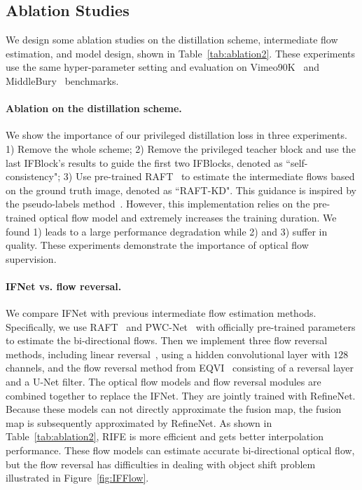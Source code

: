 \documentclass[final]{cvpr}
\begin{document}
\subsection{Ablation Studies}
\label{sec:model_ablation}



We design some ablation studies on the distillation scheme, intermediate flow estimation, and model design, shown in Table~\ref{tab:ablation2}. These experiments use the same hyper-parameter setting and evaluation on Vimeo90K~\cite{xue2019video} and MiddleBury~\cite{baker2011database} benchmarks. 

\paragraph{Ablation on the distillation scheme.} We show the importance of our privileged distillation loss in three experiments. 1) Remove the whole scheme; 2) Remove the privileged teacher block and use the last IFBlock’s results to guide the first two IFBlocks, denoted as ``self-consistency"; 3) Use pre-trained RAFT~\cite{teed2020raft} to estimate the intermediate flows based on the ground truth image, denoted as ``RAFT-KD". This guidance is inspired by the pseudo-labels method~\cite{lee2013pseudo}. However, this implementation relies on the pre-trained optical flow model and extremely increases the training duration. We found 1) leads to a large performance degradation while 2) and 3) suffer in quality. These experiments demonstrate the importance of optical flow supervision.
\paragraph{IFNet vs. flow reversal.}

We compare IFNet with previous intermediate flow estimation methods. Specifically, we use RAFT~\cite{teed2020raft} and PWC-Net~\cite{sun2018pwc} with officially pre-trained parameters to estimate the bi-directional flows. Then we implement three flow reversal methods, including linear reversal~\cite{jiang2018super}, using a hidden convolutional layer with $128$ channels, and the flow reversal method from EQVI~\cite{liu2020enhanced} consisting of a reversal layer and a U-Net filter. The optical flow models and flow reversal modules are combined together to replace the IFNet. They are jointly trained with RefineNet. Because these models can not directly approximate the fusion map, the fusion map is subsequently approximated by RefineNet. As shown in Table~\ref{tab:ablation2}, RIFE is more efficient and gets better interpolation performance. These flow models can estimate accurate bi-directional optical flow, but the flow reversal has difficulties in dealing with object shift problem illustrated in Figure~\ref{fig:IFFlow}. 
\end{document}
